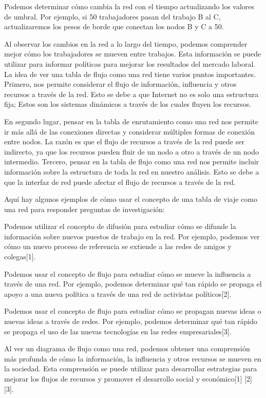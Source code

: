 Podemos determinar cómo cambia la red con el tiempo actualizando los valores de umbral. Por ejemplo, si 50 trabajadores pasan del trabajo B al C, actualizaremos los pesos de borde que conectan los nodos B y C a 50.

Al observar los cambios en la red a lo largo del tiempo, podemos comprender mejor cómo los trabajadores se mueven entre trabajos. Esta información se puede utilizar para informar políticas para mejorar los resultados del mercado laboral. La idea de ver una tabla de flujo como una red tiene varios puntos importantes. Primero, nos permite considerar el flujo de información, influencia y otros recursos a través de la red. Esto se debe a que Internet no es solo una estructura fija; Estos son los sistemas dinámicos a través de los cuales fluyen los recursos.

En segundo lugar, pensar en la tabla de enrutamiento como una red nos permite ir más allá de las conexiones directas y considerar múltiples formas de conexión entre nodos. La razón es que el flujo de recursos a través de la red puede ser indirecto, ya que los recursos pueden fluir de un nodo a otro a través de un nodo intermedio. Tercero, pensar en la tabla de flujo como una red nos permite incluir información sobre la estructura de toda la red en nuestro análisis. Esto se debe a que la interfaz de red puede afectar el flujo de recursos a través de la red.

Aquí hay algunos ejemplos de cómo usar el concepto de una tabla de viaje como una red para responder preguntas de investigación:

Podemos utilizar el concepto de difusión para estudiar cómo se difunde la información sobre nuevos puestos de trabajo en la red. Por ejemplo, podemos ver cómo un nuevo proceso de referencia se extiende a las redes de amigos y colegas[1].

Podemos usar el concepto de flujo para estudiar cómo se mueve la influencia a través de una red. Por ejemplo, podemos determinar qué tan rápido se propaga el apoyo a una nueva política a través de una red de activistas políticos[2].

Podemos usar el concepto de flujo para estudiar cómo se propagan nuevas ideas o nuevas ideas a través de redes. Por ejemplo, podemos determinar qué tan rápido se propaga el uso de las nuevas tecnologías en las redes empresariales[3].

Al ver un diagrama de flujo como una red, podemos obtener una comprensión más profunda de cómo la información, la influencia y otros recursos se mueven en la sociedad. Esta comprensión se puede utilizar para desarrollar estrategias para mejorar los flujos de recursos y promover el desarrollo social y económico[1] [2] [3]. 


